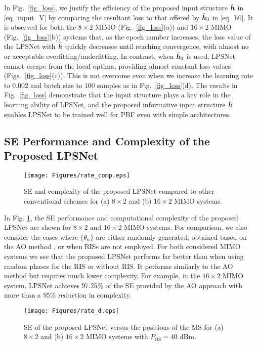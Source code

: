 \documentclass[conference]{IEEEtran}
\begin{document}
	In Fig.\ \ref{fig_loss}, we justify the efficiency of the proposed input structure $\bar{\textbf{\textit{h}}}$ in \eqref{eq_input_V} by comparing the resultant loss to that offered by $\bar{\textbf{\textit{h}}}_0$ in \eqref{eq_h0}. It is observed for both the $8 \times 2$ MIMO (Fig.\ \ref{fig_loss}(a)) and $16 \times 2$ MIMO (Fig.\ \ref{fig_loss}(b)) systems that, as the epoch number increases, the loss value of the LPSNet with $\bar{\textbf{\textit{h}}}$ quickly decreases until reaching convergence, with almost no or acceptable overfitting/underfitting. In contrast, when $\bar{\textbf{\textit{h}}}_0$ is used, LPSNet cannot escape from the local optima, providing almost constant loss values (Figs.\ \ref{fig_loss}(c)). This is not overcome even when we increase the learning rate to $0.002$ and batch size to $100$ samples as in Fig.\ \ref{fig_loss}(d). The results in Fig.\ \ref{fig_loss} demonstrate that the input structure plays a key role in the learning ability of LPSNet, and the proposed informative input structure $\bar{\textbf{\textit{h}}}$ enables LPSNet to be trained well for PBF even with simple architectures.
	
	\subsection{SE Performance and Complexity of the Proposed LPSNet}
	\begin{figure}[t]
	    \setlength{\belowcaptionskip}{-10pt}
		\texttt{[image: Figures/rate\_comp.eps]}
		\caption{SE and complexity of the proposed LPSNet compared to other conventional schemes for (a) $8 \times 2$ and (b) $16 \times 2$ MIMO systems.}
		\label{fig_rate_comp}
	\end{figure}
	
	In Fig. \ref{fig_rate_comp}, the SE performance and computational complexity of the proposed LPSNet are shown for $8 \times 2$ and $16 \times 2$ MIMO systems. For comparison, we also consider the cases where $\{ \theta_n \}$ are either randomly generated, obtained based on the AO method \cite{zhang2020capacity}, or when RISs are not employed. For both considered MIMO systems we see that the proposed LPSNet performs far better than when using random phases for the RIS or without RIS. It performs similarly to the AO method but requires much lower complexity. For example, in the $16 \times 2$ MIMO system, LPSNet achieves $97.25\%$ of the SE provided by the AO approach with more than a $95\%$ reduction in complexity.
	
	\begin{figure}[t]
	    \setlength{\belowcaptionskip}{-20pt}
		\texttt{[image: Figures/rate\_d.eps]}
		\caption{SE of the proposed LPSNet versus the positions of the MS for (a) $8 \times 2$ and (b) $16 \times 2$ MIMO systems with $P_{\mathrm{BS}} = 40$ dBm.}
		\label{fig_rate_d}
	\end{figure}
	
\end{document}
